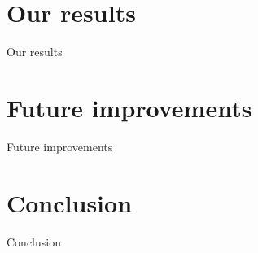 \documentclass[aspectratio=43,display]{beamer}
\begin{document}
	\section{Our results}

		\begin{frame}{Our results}
		\end{frame}

	\section{Future improvements}

		\begin{frame}{Future improvements}
		\end{frame}

	\section{Conclusion}

		\begin{frame}{Conclusion}
		\end{frame}
\end{document}
